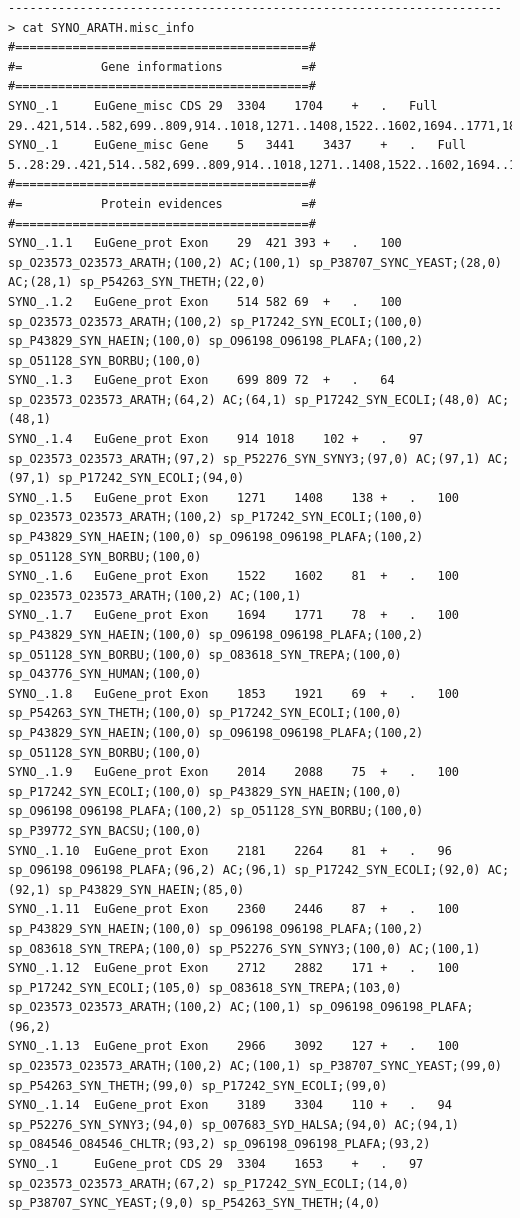 \documentclass[a4paper,titlepage]{report}
\begin{document}
\begin{Verbatim}[fontsize=\scriptsize]
---------------------------------------------------------------------
> cat SYNO_ARATH.misc_info
#=========================================#
#=           Gene informations           =#
#=========================================#
SYNO_.1  	EuGene_misc	CDS	29	3304	1704	+	.	Full	29..421,514..582,699..809,914..1018,1271..1408,1522..1602,1694..1771,1853..1921,2014..2088,2181..2264,2360..2446,2712..2882,2966..3092,3189..3304
SYNO_.1  	EuGene_misc	Gene	5	3441	3437	+	.	Full	5..28:29..421,514..582,699..809,914..1018,1271..1408,1522..1602,1694..1771,1853..1921,2014..2088,2181..2264,2360..2446,2712..2882,2966..3092,3189..3304:3305..3441
#=========================================#
#=           Protein evidences           =#
#=========================================#
SYNO_.1.1	EuGene_prot	Exon	29	421	393	+	.	100	sp_O23573_O23573_ARATH;(100,2) AC;(100,1) sp_P38707_SYNC_YEAST;(28,0) AC;(28,1) sp_P54263_SYN_THETH;(22,0) 
SYNO_.1.2	EuGene_prot	Exon	514	582	69	+	.	100	sp_O23573_O23573_ARATH;(100,2) sp_P17242_SYN_ECOLI;(100,0) sp_P43829_SYN_HAEIN;(100,0) sp_O96198_O96198_PLAFA;(100,2) sp_O51128_SYN_BORBU;(100,0) 
SYNO_.1.3	EuGene_prot	Exon	699	809	72	+	.	64	sp_O23573_O23573_ARATH;(64,2) AC;(64,1) sp_P17242_SYN_ECOLI;(48,0) AC;(48,1) 
SYNO_.1.4	EuGene_prot	Exon	914	1018	102	+	.	97	sp_O23573_O23573_ARATH;(97,2) sp_P52276_SYN_SYNY3;(97,0) AC;(97,1) AC;(97,1) sp_P17242_SYN_ECOLI;(94,0) 
SYNO_.1.5	EuGene_prot	Exon	1271	1408	138	+	.	100	sp_O23573_O23573_ARATH;(100,2) sp_P17242_SYN_ECOLI;(100,0) sp_P43829_SYN_HAEIN;(100,0) sp_O96198_O96198_PLAFA;(100,2) sp_O51128_SYN_BORBU;(100,0) 
SYNO_.1.6	EuGene_prot	Exon	1522	1602	81	+	.	100	sp_O23573_O23573_ARATH;(100,2) AC;(100,1) 
SYNO_.1.7	EuGene_prot	Exon	1694	1771	78	+	.	100	sp_P43829_SYN_HAEIN;(100,0) sp_O96198_O96198_PLAFA;(100,2) sp_O51128_SYN_BORBU;(100,0) sp_O83618_SYN_TREPA;(100,0) sp_O43776_SYN_HUMAN;(100,0) 
SYNO_.1.8	EuGene_prot	Exon	1853	1921	69	+	.	100	sp_P54263_SYN_THETH;(100,0) sp_P17242_SYN_ECOLI;(100,0) sp_P43829_SYN_HAEIN;(100,0) sp_O96198_O96198_PLAFA;(100,2) sp_O51128_SYN_BORBU;(100,0) 
SYNO_.1.9	EuGene_prot	Exon	2014	2088	75	+	.	100	sp_P17242_SYN_ECOLI;(100,0) sp_P43829_SYN_HAEIN;(100,0) sp_O96198_O96198_PLAFA;(100,2) sp_O51128_SYN_BORBU;(100,0) sp_P39772_SYN_BACSU;(100,0) 
SYNO_.1.10	EuGene_prot	Exon	2181	2264	81	+	.	96	sp_O96198_O96198_PLAFA;(96,2) AC;(96,1) sp_P17242_SYN_ECOLI;(92,0) AC;(92,1) sp_P43829_SYN_HAEIN;(85,0) 
SYNO_.1.11	EuGene_prot	Exon	2360	2446	87	+	.	100	sp_P43829_SYN_HAEIN;(100,0) sp_O96198_O96198_PLAFA;(100,2) sp_O83618_SYN_TREPA;(100,0) sp_P52276_SYN_SYNY3;(100,0) AC;(100,1) 
SYNO_.1.12	EuGene_prot	Exon	2712	2882	171	+	.	100	sp_P17242_SYN_ECOLI;(105,0) sp_O83618_SYN_TREPA;(103,0) sp_O23573_O23573_ARATH;(100,2) AC;(100,1) sp_O96198_O96198_PLAFA;(96,2) 
SYNO_.1.13	EuGene_prot	Exon	2966	3092	127	+	.	100	sp_O23573_O23573_ARATH;(100,2) AC;(100,1) sp_P38707_SYNC_YEAST;(99,0) sp_P54263_SYN_THETH;(99,0) sp_P17242_SYN_ECOLI;(99,0) 
SYNO_.1.14	EuGene_prot	Exon	3189	3304	110	+	.	94	sp_P52276_SYN_SYNY3;(94,0) sp_O07683_SYD_HALSA;(94,0) AC;(94,1) sp_O84546_O84546_CHLTR;(93,2) sp_O96198_O96198_PLAFA;(93,2) 
SYNO_.1  	EuGene_prot	CDS	29	3304	1653	+	.	97	sp_O23573_O23573_ARATH;(67,2) sp_P17242_SYN_ECOLI;(14,0) sp_P38707_SYNC_YEAST;(9,0) sp_P54263_SYN_THETH;(4,0) 
 

\end{Verbatim}
\end{document}
